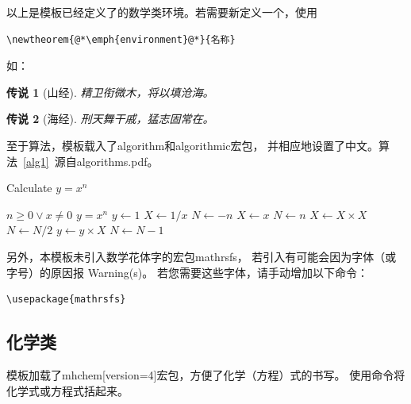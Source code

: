         以上是模板已经定义了的数学类环境。若需要新定义一个，使用
        \begin{lstlisting}[numbers=none]
\newtheorem{@*\emph{environment}@*}{名称}
        \end{lstlisting}
        如：
        \newtheorem{tale}{传说}
        \begin{tale}[山经]      %
            精卫衔微木，将以填沧海。
        \end{tale}
        \begin{tale}[海经]
            刑天舞干戚，猛志固常在。
        \end{tale}
        
        至于算法，模板载入了\textsf{algorithm}和\textsf{algorithmic}宏包，
        并相应地设置了中文。算法~\ref{alg1}~源自\textsf{algorithms.pdf}。
        \begin{algorithm}[hbt]
            \setlength{\baselineskip}{1.5em}
            \caption{Calculate $y = x^n$} 
            \label{alg1}
            \begin{algorithmic}[1]      %
                \REQUIRE $n \geqslant  0 \vee x \neq 0$ 
                \ENSURE $y = x^n$ 
                \STATE $y \leftarrow 1$ 
                \STATE $X \leftarrow 1 / x$ 
                \STATE $N \leftarrow -n$ 
                \ELSE 
                \STATE $X \leftarrow x$ 
                \STATE $N \leftarrow n$
                \ENDIF 
                \STATE $X \leftarrow X \times X$ 
                \STATE $N \leftarrow N / 2$ 
                \ELSE[$N$ is odd] 
                \STATE $y \leftarrow y \times X$ 
                \STATE $N \leftarrow N - 1$ 
                \ENDIF 
                \ENDWHILE
            \end{algorithmic}
        \end{algorithm}

		另外，本模板未引入数学花体字的宏包\textsf{mathrsfs}，
		若引入有可能会因为字体（或字号）的原因报 Warning(s)。
		若您需要这些字体，请手动增加以下命令：
	    \begin{lstlisting}[numbers=none]
\usepackage{mathrsfs}
	    \end{lstlisting}

    \subsection{化学类}
    模板加载了\textsf{mhchem[version=4]}宏包，方便了化学（方程）式的书写。
    使用命令将化学式或方程式括起来。
